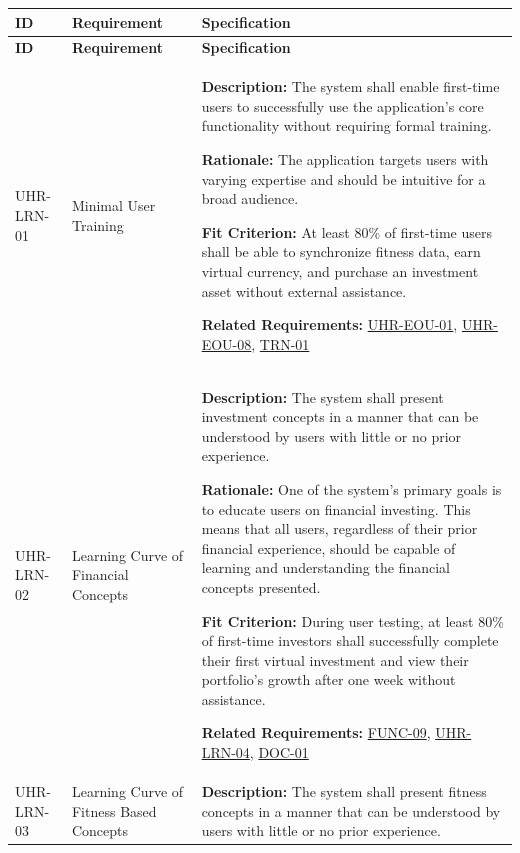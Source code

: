 \documentclass[12pt]{article}
\begin{document}
\small
\setlength{\tabcolsep}{4pt}
\begin{xltabular}{\textwidth}{|p{2.6cm}|p{3.4cm}|X|}
\hline
\textbf{ID} & \textbf{Requirement} & \textbf{Specification} \\
\hline
\endfirsthead
\hline
\textbf{ID} & \textbf{Requirement} & \textbf{Specification} \\
\hline
\endhead

UHR-LRN-01\hypertarget{req:UHR-LRN-01}{} & 
Minimal User Training & 
\textbf{Description:} The system shall enable first-time users to successfully use the application's core functionality without requiring formal training.

\textbf{Rationale:} The application targets users with varying expertise and should be intuitive for a broad audience.

\textbf{Fit Criterion:} At least 80\% of first-time users shall be able to synchronize fitness data, earn virtual currency, and purchase an investment asset without external assistance.

\textbf{Related Requirements:} \hyperlink{req:UHR-EOU-01}{UHR-EOU-01}, \hyperlink{req:UHR-EOU-08}{UHR-EOU-08}, \hyperlink{req:TRN-01}{TRN-01}\\
\hline

UHR-LRN-02\hypertarget{req:UHR-LRN-02}{} & 
Learning Curve of Financial Concepts & 
\textbf{Description:} The system shall present investment concepts in a manner that can be understood by users with little or no prior experience. 

\textbf{Rationale:} One of the system's primary goals is to educate users on financial investing. This means that all users, regardless of their prior financial experience, should be capable of learning and understanding the financial concepts presented.

\textbf{Fit Criterion:} During user testing, at least 80\% of first-time investors shall successfully complete their first virtual investment and view their portfolio's growth after one week without assistance.

\textbf{Related Requirements:} \hyperlink{req:FUNC-09}{FUNC-09}, \hyperlink{req:UHR-LRN-04}{UHR-LRN-04}, \hyperlink{req:DOC-01}{DOC-01}\\
\hline

UHR-LRN-03\hypertarget{req:UHR-LRN-03}{} & 
Learning Curve of Fitness Based Concepts & 
\textbf{Description:} The system shall present fitness concepts in a manner that can be understood by users with little or no prior experience. 


\end{xltabular}
\end{document}
